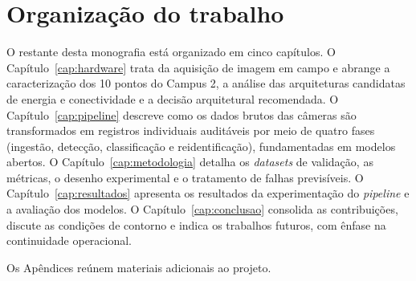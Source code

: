 \section{Organização do trabalho}
\label{sec:organizacao}


O restante desta monografia está organizado em cinco capítulos. O Capítulo~\ref{cap:hardware} trata da aquisição de imagem em campo e abrange a caracterização dos 10 pontos do Campus 2, a análise das arquiteturas candidatas de energia e conectividade e a decisão arquitetural recomendada. O Capítulo~\ref{cap:pipeline} descreve como os dados brutos das câmeras são transformados em registros individuais auditáveis por meio de quatro fases (ingestão, detecção, classificação e reidentificação), fundamentadas em modelos abertos. O Capítulo~\ref{cap:metodologia} detalha os \textit{datasets} de validação, as métricas, o desenho experimental e o tratamento de falhas previsíveis. O Capítulo~\ref{cap:resultados} apresenta os resultados da experimentação do \textit{pipeline} e a avaliação dos modelos. O Capítulo~\ref{cap:conclusao} consolida as contribuições, discute as condições de contorno e indica os trabalhos futuros, com ênfase na continuidade operacional.


Os Apêndices reúnem materiais adicionais ao projeto.
